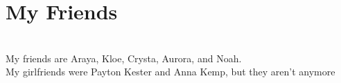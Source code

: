 \documentclass[10pt]{report}
\newcommand{\fbd}{
    \setlength{\fboxsep}{0pt}
    \setlength{\fboxrule}{3pt}
  }
\begin{document}
\section*{My Friends}{%
  \fbd
  }
\;\\
My friends are Araya, Kloe, Crysta, Aurora, and Noah.\\
My girlfriends were Payton Kester and Anna Kemp, but they aren't anymore\\
\clearpar
\end{document}
